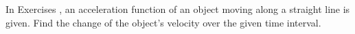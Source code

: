 {\noindent In Exercises}
{, an acceleration function of an object moving along a straight line is given. Find the change of the object's velocity over the given time interval.
}
